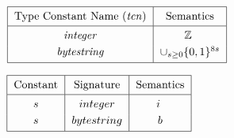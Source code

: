 \documentclass[../plutus-core-specification.tex]{subfiles}
\begin{document}
\vspace{1cm}


\begin{minipage}{\linewidth}
\centering

    \(\begin{tabular}{|c|c|}\hline
    \Strut
        \textrm{Type Constant Name (\textit{tcn})} & \textrm{Semantics}\\
        \hline
        \textit{integer} & $\mathbb{Z}$ \rule{0mm}{4mm}  \\[3pt]
        \textit{bytestring} & $\cup_{s \ge 0}\{0,1\}^{8s}$\\[3pt]
        \hline
   \end{tabular}\)
   \label{fig:type_constants}

\end{minipage}
\vspace{1cm}



\begin{minipage}{\linewidth}
\centering
   \(\begin{tabular}{|c|c|c|}\hline
    \Strut
        \textrm{Constant} & \textrm{Signature} & \textrm{Semantics}\\
        \hline
        $s$   & $\constsig{integer}$  &$i$ \rule{0mm}{4mm} \\[3pt]
        $s$   & $\constsig{bytestring}$ & $b$\\[3pt]
        \hline
    \end{tabular}\)
    \label{fig:constants}
\end{minipage}

\end{document}
